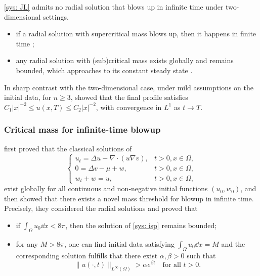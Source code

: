 
\begin{frame}
\eqref{sys: JL} admits no radial solution that blows up in infinite time under two-dimensional settings.
\begin{itemize}
\item if a radial solution with supercritical mass blows up, then it happens in finite time ;
\item any radial solution with (sub)critical mass exists globally and remains bounded, which approaches to its constant steady state .
\end{itemize}
In sharp contrast with the two-dimensional case, 
under mild assumptions on the initial data, for $n \geq 3$,  showed that the final profile satisfies $C_1|x|^{-2} \leq u(x, T) \leq C_2|x|^{-2}$, with convergence in $L^1$ as $t \rightarrow T$.
\end{frame}


\begin{frame}
\frametitle{Critical mass for infinite-time blowup}
  first proved that the classical solutions of 
 \begin{equation}\tag{ISP}
\begin{cases}
	\label{sys: isp}
		u_t = \Delta u - \nabla \cdot(u\nabla v),&  t>0, x\in\Omega,\\
		0 =  \Delta v - \mu + w,&  t>0, x\in\Omega,	\\
		w_t + w = u, &  t > 0, x\in\Omega,
\end{cases}
\end{equation}
exist globally for all continuous and non-negative initial functions $(u_0, w_0)$, and then showed that there exists a novel mass threshold for blowup in infinite time. Precisely, they considered the radial solutions and proved that
\begin{itemize}
\item if $\int_\Omega u_0\dd{x} < 8\pi$, then the solution of \eqref{sys: isp} remains bounded;
\item for any $M > 8\pi$, one can find initial data satisfying $\int_\Omega u_0\dd{x} = M$ and the corresponding solution fulfills that there exist $\alpha,\beta > 0$ such that
\[
\|{u(\cdot, t)}\|_{L^\infty(\Omega)} > \alpha e^{\beta t} \quad\text{for all } t>0.
\]
\end{itemize}
\end{frame}

